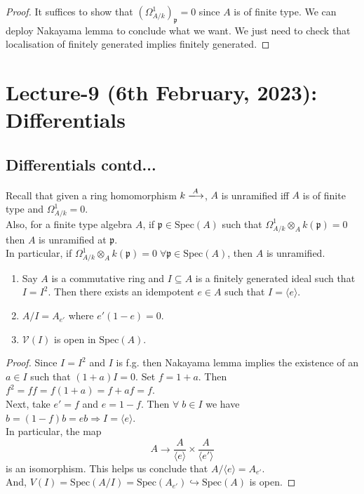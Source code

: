 \documentclass[oneside, 12pt, ]{scrbook}
\newcommand{\V}{\mathcal{V}}
\newcommand{\spec}{\mathrm{Spec}}
\newcommand{\pr}{\mathfrak{p}}
\theoremstyle{theorem}
\begin{document}
\begin{proof}
It suffices to show that $(\Omega_{A/k}^1)_{\pr} =0$ since $A$ is of finite type. We can deploy Nakayama lemma to conclude what we want. We just need to check that localisation of finitely generated implies finitely generated.
\end{proof}


\chapter{Lecture-9 (6th February, 2023): Differentials}

\section{Differentials contd...}
Recall that given a ring homomorphism $k \xlongrightarrow{A}$, $A$ is unramified iff $A$ is of finite type and $\Omega_{A/k}^{1} =0$. \\

Also, for a finite type algebra $A$, if $\pr \in \spec(A)$ such that $\Omega_{A/k}^{1} \otimes_{A} k (\pr) = 0$ then $A$ is unramified at $\pr$. \\

In particular, if $\Omega_{A/k}^{1} \otimes_{A} k(\pr) = 0 \; \forall \pr \in \spec(A)$, then $A$ is unramified.

\begin{lemma}
\begin{enumerate}
\item Say $A$ is a commutative ring and $I \subseteq A$ is a finitely generated ideal such that $I=I^2$. Then there exists an idempotent $e \in A$ such that $I= \langle e \rangle$.
\item $A/I = A_{e'}$ where $e'(1-e)=0$.
\item $\V(I)$ is open in $\spec(A)$.
\end{enumerate}
\end{lemma}

\begin{proof}
Since $I=I^2$ and $I$ is f.g. then Nakayama lemma implies the existence of an $a\in I$ such that $(1+a)I=0$. Set $f = 1+a$. Then $f^2 = ff = f(1+a)=f + af =f$. \\

Next, take $e' = f$ and $e = 1-f$. Then $\forall \; b \in I$ we have $b=(1-f)b=eb \Rightarrow I =\langle e \rangle$. \\

In particular, the map $$A \rightarrow \frac{A}{\langle e \rangle} \times \frac{A}{\langle e' \rangle}$$ is an isomorphism. This helps us conclude that $A/ \langle e \rangle = A_{e'}$. \\

And, $V(I) = \spec(A/I) = \spec(A_{e'}) \hookrightarrow \spec(A)$ is open. 
\end{proof}
\end{document}
